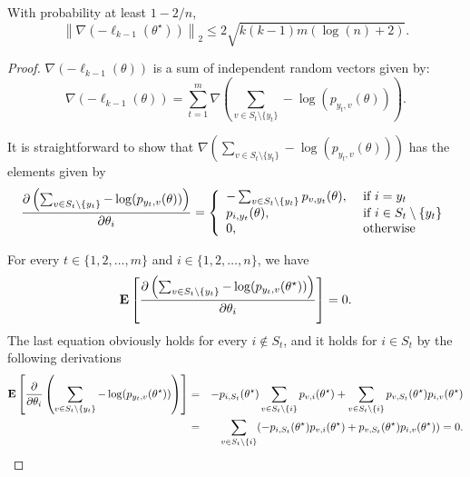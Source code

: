 
\begin{lemma} With probability at least $1-2/n$,
\begin{equation}
\left\| \nabla(-\ell_{k-1}(\theta^\star))\right\|_2  \le  2\sqrt{k(k-1) m (\log (n)+2)}.
\label{eq:s1-grad-u}
\end{equation}
\label{lem:break1nabla}
\end{lemma}

\begin{proof} $\nabla(-\ell_{k-1}(\theta))$ is a sum of independent random vectors given by:
$$
\nabla(-\ell_{k-1}(\theta)) = \sum_{t=1}^m \nabla\left(\sum_{v\in S_t\setminus \{y_t\}} -\log(p_{y_t,v}(\theta))\right).
$$ 

It is straightforward to show that $\nabla\left(\sum_{v\in S_t\setminus \{y_t\}} -\log(p_{y_t,v}(\theta))\right)$ has the elements given by
\begin{equation}
\frac{\partial \left(\sum_{v\in S_t\setminus \{y_t\}} -\log(p_{y_t,v}(\theta))\right)}{\partial \theta_i} = \left\{
\begin{array}{ll}
-\sum_{v\in S_t\setminus \{y_t\}}p_{v,y_t}(\theta), & \hbox{ if } i=y_t\\
p_{i,y_t}(\theta), & \hbox{ if } i\in S_t\setminus \{y_t\}\\
0, & \hbox{ otherwise }
\end{array}
\right .
\label{equ:partlik1}
\end{equation}

For every $t\in \{1,2,\ldots,m\}$ and $i \in \{1,2,\ldots,n\}$, we have
$$
\mathbf{E}\left[\frac{\partial \left(\sum_{v\in S_t\setminus \{y_t\}}-\log(p_{y_t,v}(\theta^\star))\right)}{\partial \theta_i}\right] = 0.
$$
The last equation obviously holds for every $i\notin S_t$, and it holds for $i\in S_t$ by the following derivations 
\begin{eqnarray*}
\mathbf{E}\left[\frac{\partial}{\partial \theta_i}\left(\sum_{v\in S_t\setminus \{y_t\}}-\log(p_{y_t,v}(\theta^\star))\right)\right]
 & = & -p_{i,S_t}(\theta^\star)\sum_{v\in S_t \setminus\{ i\}} p_{v,i}(\theta^\star) 
+ \sum_{v\in S_t \setminus\{ i\}} p_{v,S_t}(\theta^\star)p_{i,v}(\theta^\star)\\
& = & \sum_{v\in S_t \setminus\{ i\}} (-p_{i,S_t}(\theta^\star) p_{v,i}(\theta^\star) 
+ p_{v,S_t}(\theta^\star)p_{i,v}(\theta^\star))=0.
\end{eqnarray*}


\end{proof}
